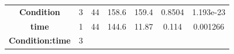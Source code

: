 \documentclass[]{article}
\theoremstyle{definition}
\theoremstyle{definition}
\theoremstyle{definition}
\theoremstyle{remark}
\begin{document}
\begin{longtable}[]{@{}ccccccc@{}}
\begin{minipage}[t]{0.23\columnwidth}
\textbf{Condition}\strut
\end{minipage} & \begin{minipage}[t]{0.10\columnwidth}\centering\strut
3\strut
\end{minipage} & \begin{minipage}[t]{0.10\columnwidth}\centering\strut
44\strut
\end{minipage} & \begin{minipage}[t]{0.09\columnwidth}\centering\strut
158.6\strut
\end{minipage} & \begin{minipage}[t]{0.09\columnwidth}\centering\strut
159.4\strut
\end{minipage} & \begin{minipage}[t]{0.10\columnwidth}\centering\strut
0.8504\strut
\end{minipage} & \begin{minipage}[t]{0.12\columnwidth}\centering\strut
1.193e-23\strut
\end{minipage}\tabularnewline
\begin{minipage}[t]{0.23\columnwidth}\centering\strut
\textbf{time}\strut
\end{minipage} & \begin{minipage}[t]{0.10\columnwidth}\centering\strut
1\strut
\end{minipage} & \begin{minipage}[t]{0.10\columnwidth}\centering\strut
44\strut
\end{minipage} & \begin{minipage}[t]{0.09\columnwidth}\centering\strut
144.6\strut
\end{minipage} & \begin{minipage}[t]{0.09\columnwidth}\centering\strut
11.87\strut
\end{minipage} & \begin{minipage}[t]{0.10\columnwidth}\centering\strut
0.114\strut
\end{minipage} & \begin{minipage}[t]{0.12\columnwidth}\centering\strut
0.001266\strut
\end{minipage}\tabularnewline
\begin{minipage}[t]{0.23\columnwidth}\centering\strut
\textbf{Condition:time}\strut
\end{minipage} & \begin{minipage}[t]{0.10\columnwidth}\centering\strut
3\strut
\end{minipage} & \begin{minipage}[t]{0.10\columnwidth}\centering\strut

\end{minipage}
\end{longtable}
\end{document}
